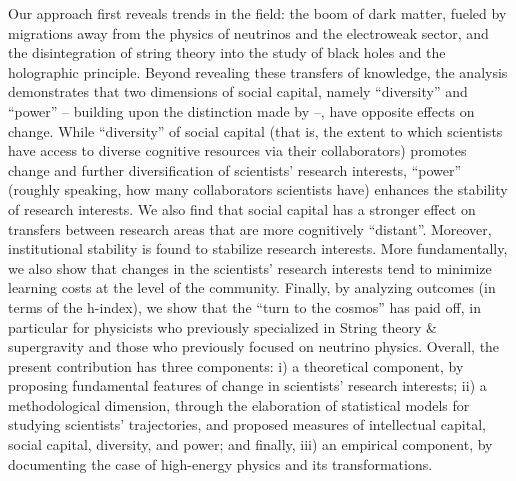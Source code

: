 \documentclass{article}
\begin{document}
Our approach first reveals trends in the field: the boom of dark matter, fueled by migrations away from the physics of neutrinos and the electroweak sector, and the disintegration of string theory into the study of black holes and the holographic principle. Beyond revealing these transfers of knowledge, the analysis demonstrates that two dimensions of social capital, namely ``diversity'' and ``power''  -- building upon the distinction made by \citet{Abbasi2014} --, have opposite effects on change. While ``diversity'' of social capital (that is, the extent to which scientists have access to diverse cognitive resources via their collaborators) promotes change and further diversification of scientists' research interests, ``power'' (roughly speaking, how many collaborators scientists have) enhances the stability of research interests. We also find that social capital has a stronger effect on transfers between research areas that are more cognitively ``distant''. Moreover, institutional stability is found to stabilize research interests. More fundamentally, we also show that changes in the scientists' research interests tend to minimize learning costs at the level of the community. Finally, by analyzing outcomes (in terms of the h-index), we show that the ``turn to the cosmos'' has paid off, in particular for physicists who previously specialized in String theory \& supergravity and those who previously focused on neutrino physics. Overall, the present contribution has three components: i) a theoretical component, by proposing fundamental features of change in scientists' research interests; ii) a methodological dimension, through the elaboration of statistical models for studying scientists' trajectories, and proposed measures of intellectual capital, social capital, diversity, and power; and finally, iii) an empirical component, by documenting the case of high-energy physics and its transformations.
\end{document}
